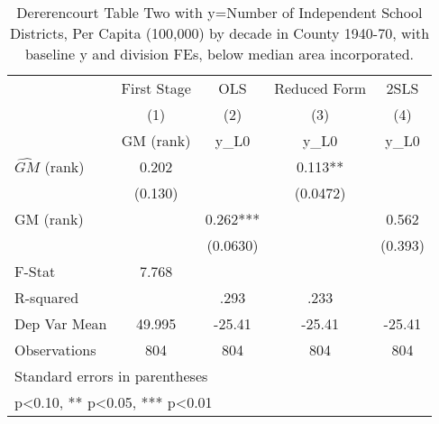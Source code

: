 \begin{table}[htbp]\centering
\def\sym#1{\ifmmode^{#1}\else\(^{#1}\)\fi}
\caption{Dererencourt Table Two with y=Number of Independent School Districts, Per Capita (100,000) by decade in County 1940-70, with baseline y and division FEs, below median area incorporated.}
\begin{tabular}{l*{4}{c}}
\toprule
                    & First Stage   &         OLS   &Reduced Form   &        2SLS   \\
                    &\multicolumn{1}{c}{(1)}&\multicolumn{1}{c}{(2)}&\multicolumn{1}{c}{(3)}&\multicolumn{1}{c}{(4)}\\
                    &\multicolumn{1}{c}{GM  (rank)}&\multicolumn{1}{c}{y\_L0}&\multicolumn{1}{c}{y\_L0}&\multicolumn{1}{c}{y\_L0}\\
\midrule
$\hat{GM}$ (rank)   &       0.202   &               &       0.113** &               \\
                    &     (0.130)   &               &    (0.0472)   &               \\
\addlinespace
GM  (rank)          &               &       0.262***&               &       0.562   \\
                    &               &    (0.0630)   &               &     (0.393)   \\
\midrule
F-Stat              &       7.768   &               &               &               \\
R-squared           &               &        .293   &        .233   &               \\
Dep Var Mean        &      49.995   &      -25.41   &      -25.41   &      -25.41   \\
Observations        &         804   &         804   &         804   &         804   \\
\bottomrule
\multicolumn{5}{l}{\footnotesize Standard errors in parentheses}\\
\multicolumn{5}{l}{\footnotesize * p<0.10, ** p<0.05, *** p<0.01}\\
\end{tabular}
\end{table}
